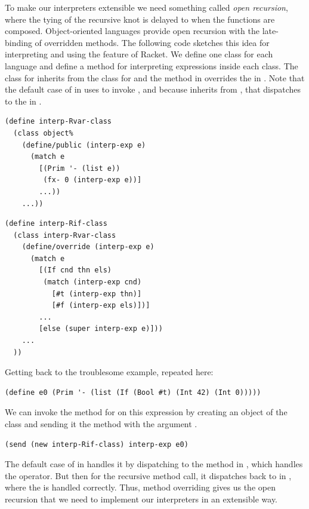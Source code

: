 \documentclass[11pt]{book}
\begin{document}
To make our interpreters extensible we need something called
\emph{open recursion}, where the tying of the
recursive knot is delayed to when the functions are
composed. Object-oriented languages provide open recursion with the
late-binding of overridden methods. The
following code sketches this idea for interpreting \LangVar{} and
\LangIf{} using the
\href{https://docs.racket-lang.org/guide/classes.html}{}
 feature of Racket.  We define one class for each
language and define a method for interpreting expressions inside each
class. The class for \LangIf{} inherits from the class for \LangVar{}
and the method  in \LangIf{} overrides the
 in \LangVar{}. Note that the default case of
 in \LangIf{} uses  to invoke
, and because \LangIf{} inherits from \LangVar{},
that dispatches to the  in \LangVar{}.
\begin{center}
\begin{minipage}{0.45\textwidth}
\begin{lstlisting}
(define interp-Rvar-class
  (class object%
    (define/public (interp-exp e)
      (match e
        [(Prim '- (list e))
         (fx- 0 (interp-exp e))]
        ...))
    ...))
\end{lstlisting}
\end{minipage}
\begin{minipage}{0.45\textwidth}
  \begin{lstlisting}
(define interp-Rif-class
  (class interp-Rvar-class
    (define/override (interp-exp e)
      (match e
        [(If cnd thn els)
         (match (interp-exp cnd)
           [#t (interp-exp thn)]
           [#f (interp-exp els)])]
        ...
        [else (super interp-exp e)]))
    ...
  ))
\end{lstlisting}
\end{minipage}
\end{center}
Getting back to the troublesome example, repeated here:
\begin{lstlisting}
(define e0 (Prim '- (list (If (Bool #t) (Int 42) (Int 0)))))
\end{lstlisting}
We can invoke the  method for \LangIf{} on this
expression by creating an object of the \LangIf{} class and sending it the
 method with the argument .
\begin{lstlisting}
(send (new interp-Rif-class) interp-exp e0)
\end{lstlisting}
The default case of  in \LangIf{} handles it by
dispatching to the  method in \LangVar{}, which
handles the \code{-} operator. But then for the recursive method call,
it dispatches back to  in \LangIf{}, where the
 is handled correctly. Thus, method overriding gives us the
open recursion that we need to implement our interpreters in an
extensible way.
\end{document}
